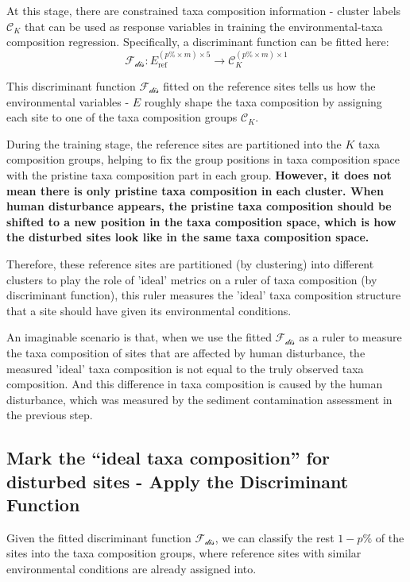 At this stage, there are constrained taxa composition information - cluster labels \(\mathcal{C}_K\) that can be used as
response variables in training the environmental-taxa composition regression. 
Specifically, a discriminant function can be fitted here:
\[
\mathcal{F_{\text{dis}}} : E_{\text{ref}}^{(p\% \times m) \times 5} \to \mathcal{C}_K^{(p\% \times m) \times 1}
\]

This discriminant function \(\mathcal{F_{\text{dis}}}\) fitted on the reference sites tells us how the environmental variables - \(E\) roughly shape the 
taxa composition by assigning each site to one of the taxa composition groups \(\mathcal{C}_K\).

During the training stage, the reference sites are partitioned into the \(K\) taxa composition groups, 
helping to fix the group positions in taxa composition space with the pristine taxa composition part in 
each group. \textbf{However, it does not mean there is only pristine taxa composition in each cluster.
When human disturbance appears, the pristine taxa composition should be shifted to a new position in the taxa composition space,
which is how the disturbed sites look like in the same taxa composition space.}

Therefore, these reference sites are partitioned (by clustering) into different clusters to play the role of 'ideal' metrics
on a ruler of taxa composition (by discriminant function), this ruler measures the 'ideal' taxa composition structure that a site should have given its environmental conditions.

An imaginable scenario is that, when we use the fitted \(\mathcal{F_{\text{dis}}}\) as a ruler to measure the taxa composition of sites that are affected by human disturbance,
the measured 'ideal' taxa composition is not equal to the truly observed taxa composition. 
And this difference in taxa composition is caused by the human disturbance, which was measured by the sediment contamination assessment in the previous step.

\subsection{Mark the “ideal taxa composition” for disturbed sites - Apply the Discriminant Function}

Given the fitted discriminant function \(\mathcal{F_{\text{dis}}}\), we can classify the rest \(1 - p\%\) of the sites
into the taxa composition groups, where reference sites with similar environmental conditions are already assigned into.

